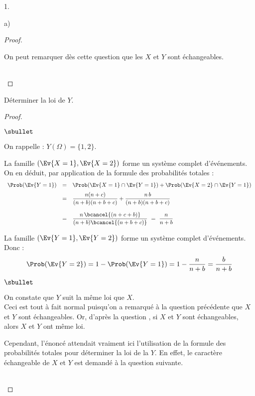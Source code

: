 \documentclass[11pt]{article}%
\begin{document}
\begin{noliste}{1.}
\begin{noliste}{a)}
\begin{proof}
 \begin{remark}
  On peut remarquer dès cette question que les \var $X$ et $Y$ sont 
  échangeables.
 \end{remark}~\\[-1.4cm]
\end{proof}


\item Déterminer la loi de $Y$.

\begin{proof}~
 \begin{noliste}{$\sbullet$}
  \item On rappelle : $Y(\Omega)=\{1,2\}$.
  
  \item La famille $(\Ev{X=1},\Ev{X=2})$ forme un système complet
    d'événements.\\
    On en déduit, par application de la formule des probabilités
    totales :
    \[
    \begin{array}{rcl}
      \Prob(\Ev{Y=1}) & = & \Prob(\Ev{X=1} \cap \Ev{Y=1}) + 
      \Prob(\Ev{X=2}\cap \Ev{Y=1})
      \\[.2cm]
      & = & \dfrac{n(n+c)}{(n+b)(n+b+c)} + \dfrac{n \, b}{(n+b)(n+b+c)}
      \\[.6cm]
      & = & \dfrac{n\, \bcancel{(n+c+b)}}{(n+b)\bcancel{(n+b+c)}}
      \ = \ \dfrac{n}{n+b}
    \end{array}
    \]
  
  \item La famille $(\Ev{Y=1},\Ev{Y=2})$ forme un système complet 
  d'événements. Donc :
  \[
   \Prob(\Ev{Y=2}) = 1-\Prob(\Ev{Y=1}) = 1-\dfrac{n}{n+b} = 
   \dfrac{b}{n+b}
  \]
 \end{noliste}
 
 
 \newpage
 
 
 
 \begin{remark}
  \begin{noliste}{$\sbullet$}
  \item On constate que $Y$ suit la même loi que $X$.\\
    Ceci est tout à fait normal puisqu'on a remarqué à la question
    précédente que $X$ et $Y$ sont échangeables. Or, d'après la
    question , si $X$ et $Y$ sont échangeables, alors $X$ et
    $Y$ ont même loi.
  \item Cependant, l'énoncé attendait vraiment ici l'utilisation de la
    formule des probabilités totales pour déterminer la loi de la \var
    $Y$. En effet, le caractère échangeable de $X$ et $Y$ est demandé
    à la question suivante.
  \end{noliste}
\end{remark}~\\[-1.4cm]
\end{proof}



\end{noliste}
\end{noliste}
\end{document}
